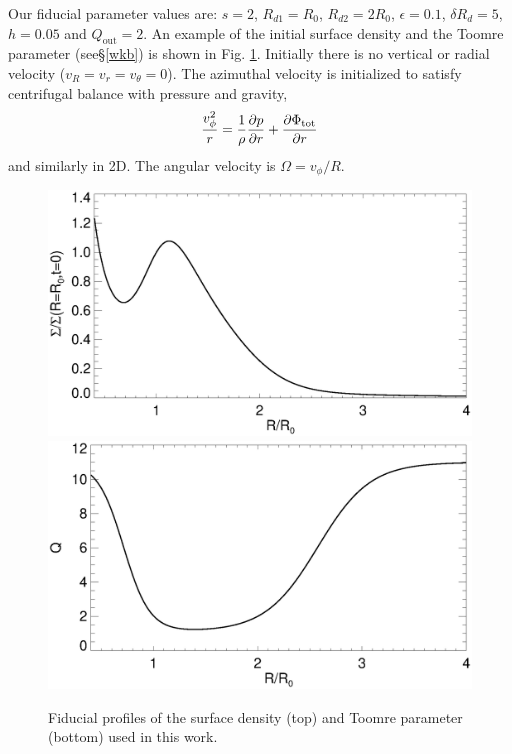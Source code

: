 Our fiducial parameter values are: $s=2$, $R_{d1}=R_0$, $R_{d2}=2R_0$,
$\epsilon=0.1$, $\delta R_d=5$, $h=0.05$ and
$Q_\mathrm{out}=2$. An example of the initial surface density and the
Toomre parameter (see\S\ref{wkb}) is shown in Fig. \ref{initial_surf}. 
Initially there is no vertical or radial velocity
($v_R = v_r = v_\theta = 0$). The azimuthal velocity is initialized to
satisfy centrifugal balance with pressure and gravity,
\begin{align}
  \frac{v_\phi^2}{r} = \frac{1}{\rho}\frac{\partial p}{\partial r} + \frac{\partial
    \Phi_\mathrm{tot}}{\partial r}
\end{align}
and similarly in 2D. The angular velocity is $\Omega = v_\phi/R$. 


\begin{figure}
  \includegraphics[width=\linewidth,clip=true,trim=0cm 1.7cm 0cm
  0cm]{figures/compare_profiles_dens000} 
  \includegraphics[width=\linewidth]{figures/compare_profiles_Q000}
  \caption{Fiducial profiles of the surface density (top) and Toomre
    parameter (bottom) used in this work.\label{initial_surf}}
\end{figure}


